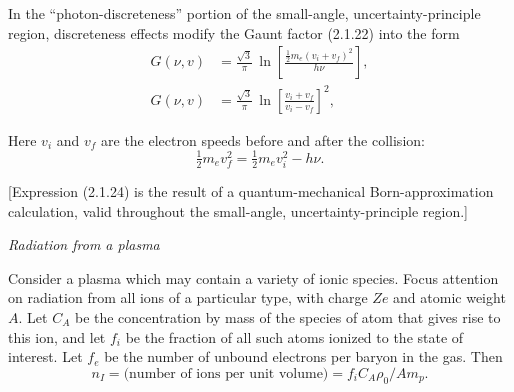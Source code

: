 In the ``photon-discreteness'' portion of the small-angle, uncertainty-principle
region, discreteness effects modify the Gaunt factor (2.1.22) into the form
\begin{subequations}
\begin{align}
G(\nu,v) &= \frac{\sqrt{3}}{\pi}\,
\ln\!\left[\frac{\frac{1}{2}m_e(v_i + v_f)^2}{h\nu}\right],
\tag{2.1.24a}\\[6pt]
G(\nu,v) &= \frac{\sqrt{3}}{\pi}\,
\ln\!\left[\frac{v_i + v_f}{v_i - v_f}\right]^2,
\tag{2.1.24b}
\end{align}
\end{subequations}

Here $v_i$ and $v_f$ are the electron speeds before and after the collision:
\begin{equation}
\tfrac{1}{2}m_e v_f^2 = \tfrac{1}{2}m_e v_i^2 - h\nu.
\end{equation}

[Expression (2.1.24) is the result of a quantum-mechanical Born-approximation
calculation, valid throughout the small-angle, uncertainty-principle region.]


\bigskip
\textit{Radiation from a plasma}

Consider a plasma which may contain a variety of ionic species.  Focus attention
on radiation from all ions of a particular type, with charge $Ze$ and atomic weight
$A$.  Let $C_A$ be the concentration by mass of the species of atom that gives rise to
this ion, and let $f_i$ be the fraction of all such atoms ionized to the state of interest.
Let $f_e$ be the number of unbound electrons per baryon in the gas.  Then
\begin{equation}
n_I = \text{(number of ions per unit volume)} = f_i C_A \rho_0 / A m_p.
\tag{2.1.25}
\end{equation}

